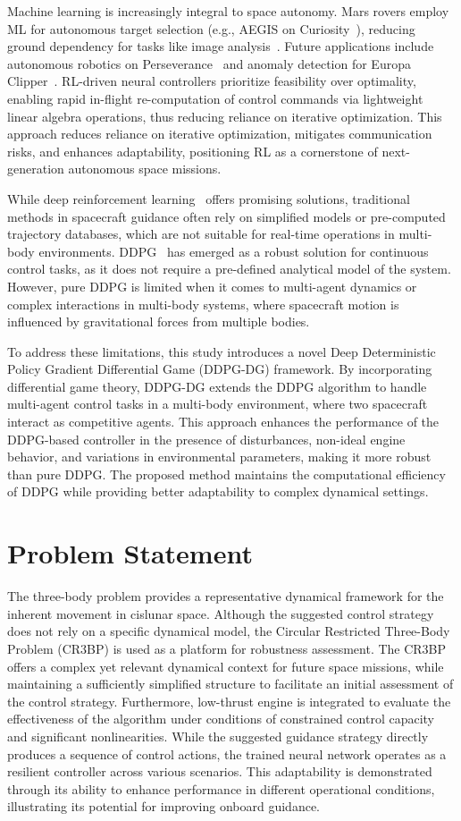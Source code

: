 \documentclass[conference]{IEEEtran}
\begin{document}
Machine learning is increasingly integral to space autonomy. Mars rovers employ ML for autonomous target selection (e.g., AEGIS on Curiosity~\cite{17}), reducing ground dependency for tasks like image analysis~\cite{18}. Future applications include autonomous robotics on Perseverance~\cite{19,20} and anomaly detection for Europa Clipper~\cite{Clipper}. RL-driven neural controllers prioritize feasibility over optimality, enabling rapid in-flight re-computation of control commands via lightweight linear algebra operations, thus reducing reliance on iterative optimization. This approach reduces reliance on iterative optimization, mitigates communication risks, and enhances adaptability, positioning RL as a cornerstone of next-generation autonomous space missions.

While deep reinforcement learning~\cite{newrl} offers promising solutions, traditional methods in spacecraft guidance often rely on simplified models or pre-computed trajectory databases, which are not suitable for real-time operations in multi-body environments. DDPG~\cite{DDPG} has emerged as a robust solution for continuous control tasks, as it does not require a pre-defined analytical model of the system. However, pure DDPG is limited when it comes to multi-agent dynamics or complex interactions in multi-body systems, where spacecraft motion is influenced by gravitational forces from multiple bodies.

To address these limitations, this study introduces a novel Deep Deterministic Policy Gradient Differential Game (DDPG-DG) framework. By incorporating differential game theory, DDPG-DG extends the DDPG algorithm to handle multi-agent control tasks in a multi-body environment, where two spacecraft interact as competitive agents. This approach enhances the performance of the DDPG-based controller in the presence of disturbances, non-ideal engine behavior, and variations in environmental parameters, making it more robust than pure DDPG. The proposed method maintains the computational efficiency of DDPG while providing better adaptability to complex dynamical settings.


\section{Problem Statement}
The three-body problem provides a representative dynamical framework for the inherent movement in cislunar space.
Although the suggested control strategy does not rely on a specific dynamical model, the Circular Restricted Three-Body Problem (CR3BP) is used as a platform for robustness assessment.
The CR3BP offers a complex yet relevant dynamical context for future space missions, while maintaining a sufficiently simplified structure to facilitate an initial assessment of the control strategy.
Furthermore, low-thrust engine is integrated to evaluate the effectiveness of the algorithm under conditions of constrained control capacity and significant nonlinearities.
While the suggested guidance strategy directly produces a sequence of control actions, the trained neural network operates as a resilient controller across various scenarios.
This adaptability is demonstrated through its ability to enhance performance in different operational conditions, illustrating its potential for improving onboard guidance.
\end{document}
